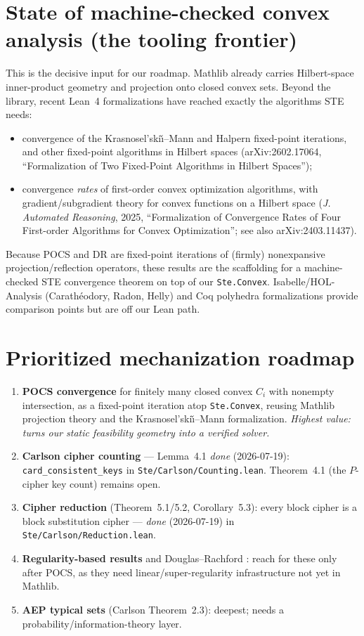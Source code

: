 \documentclass[11pt]{article}
\begin{document}
\section{State of machine-checked convex analysis (the tooling frontier)}
This is the decisive input for our roadmap. Mathlib already carries
Hilbert-space inner-product geometry and projection onto closed convex
sets. Beyond the library, recent Lean~4 formalizations have reached
exactly the algorithms STE needs:
\begin{itemize}
\item convergence of the Krasnosel'ski\v{\i}--Mann and Halpern
  fixed-point iterations, and other fixed-point algorithms in Hilbert
  spaces (arXiv:2602.17064, ``Formalization of Two Fixed-Point Algorithms
  in Hilbert Spaces'');
\item convergence \emph{rates} of first-order convex optimization
  algorithms, with gradient/subgradient theory for convex functions on a
  Hilbert space (\emph{J. Automated Reasoning}, 2025,
  ``Formalization of Convergence Rates of Four First-order Algorithms for
  Convex Optimization''; see also arXiv:2403.11437).
\end{itemize}
Because POCS and DR are fixed-point iterations of (firmly) nonexpansive
projection/reflection operators, these results are the scaffolding for a
machine-checked STE convergence theorem on top of our
\texttt{Ste.Convex}. Isabelle/HOL-Analysis (Carath\'eodory, Radon, Helly)
and Coq polyhedra formalizations provide comparison points but are off
our Lean path.

\section{Prioritized mechanization roadmap}
\begin{enumerate}
\item \textbf{POCS convergence} for finitely many closed convex $C_i$ with
  nonempty intersection, as a fixed-point iteration atop
  \texttt{Ste.Convex}, reusing Mathlib projection theory and the
  Krasnosel'ski\v{\i}--Mann formalization. \emph{Highest value: turns our
  static feasibility geometry into a verified solver.}
\item \textbf{Carlson cipher counting} --- Lemma~4.1 \emph{done}
  (2026-07-19): \texttt{card\_consistent\_keys} in
  \texttt{Ste/Carlson/Counting.lean}. Theorem~4.1 (the $P$-cipher key
  count) remains open.
\item \textbf{Cipher reduction} (Theorem~5.1/5.2, Corollary~5.3): every
  block cipher is a block substitution cipher --- \emph{done}
  (2026-07-19) in \texttt{Ste/Carlson/Reduction.lean}.
\item \textbf{Regularity-based results} and Douglas--Rachford
  \citep{lindstrom2021}: reach for these only after POCS, as they need
  linear/super-regularity infrastructure not yet in Mathlib.
\item \textbf{AEP typical sets} (Carlson Theorem~2.3): deepest; needs a
  probability/information-theory layer.
\end{enumerate}
\end{document}

